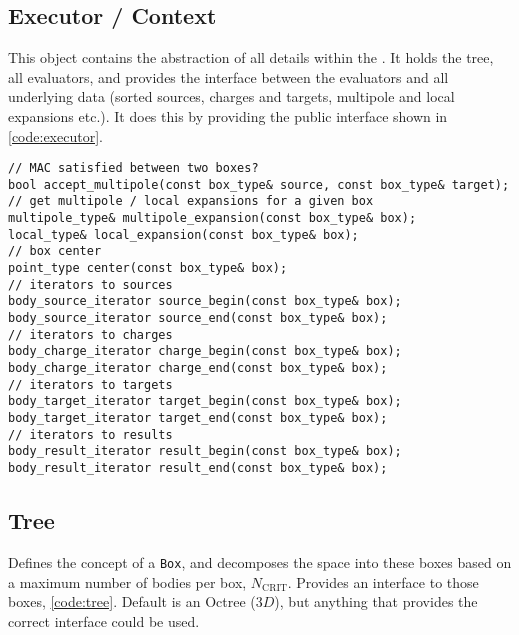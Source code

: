 \subsection{Executor / Context}\label{subsec:executor}

This object contains the abstraction of all details within the {\fmm}. It holds the tree, all evaluators, and provides the interface between the evaluators and all underlying data (sorted sources, charges and targets, multipole and local expansions etc.). It does this by providing the public interface shown in \ref{code:executor}.

\begin{figure*}[h]

\begin{lstlisting}
// MAC satisfied between two boxes?
bool accept_multipole(const box_type& source, const box_type& target);
// get multipole / local expansions for a given box
multipole_type& multipole_expansion(const box_type& box);
local_type& local_expansion(const box_type& box);
// box center
point_type center(const box_type& box);
// iterators to sources
body_source_iterator source_begin(const box_type& box);
body_source_iterator source_end(const box_type& box);
// iterators to charges
body_charge_iterator charge_begin(const box_type& box);
body_charge_iterator charge_end(const box_type& box);
// iterators to targets
body_target_iterator target_begin(const box_type& box);
body_target_iterator target_end(const box_type& box);
// iterators to results
body_result_iterator result_begin(const box_type& box);
body_result_iterator result_end(const box_type& box);
\end{lstlisting}
\caption{Methods exposed by executor / context}
\label{code:executor}
\end{figure*}

\subsection{Tree}\label{subsec:tree}

Defines the concept of a {\lstinline|Box|}, and decomposes the space into these boxes based on a maximum number of bodies per box, $N_{\text{CRIT}}$. Provides an interface to those boxes, \ref{code:tree}. Default is an Octree ($3D$), but anything that provides the correct interface could be used.

